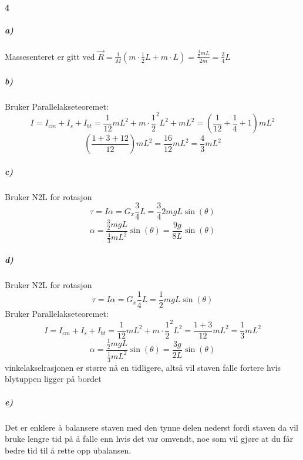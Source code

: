 \documentclass[11pt, A4paper,norsk]{article}
\begin{document}
		\paragraph{4}
			\subparagraph{a)}
				\begin{flushleft}
Massesenteret er gitt ved $\vec{R} = \frac{1}{M}(m \cdot \frac{1}{2}L + m \cdot L) = \frac{\frac{3}{2}mL}{2m} = \frac{3}{4}L$
				\end{flushleft}










			\subparagraph{b)}
				\begin{flushleft}
Bruker Parallelakseteoremet:
$$I = I_{cm} + I_s + I_{bt} = \frac{1}{12}mL^2 + m \cdot \frac{1}{2}^2L^2 + mL^2 = \left( \frac{1}{12} + \frac{1}{4} + 1 \right)mL^2$$
$$\left( \frac{1 + 3 + 12}{12} \right)mL^2 = \frac{16}{12} mL^2 = \frac{4}{3} mL^2$$
				\end{flushleft}










			\subparagraph{c)}
				\begin{flushleft}
Bruker N2L for rotasjon
$$\tau = I \alpha = G_x \frac{3}{4} L = \frac{3}{4} 2mgL \sin(\theta)$$
$$\alpha = \frac{\frac{3}{2} mgL}{\frac{4}{3}mL^2} \sin(\theta) = \frac{9g}{8L} \sin(\theta)$$
				\end{flushleft}








			\subparagraph{d)}
				\begin{flushleft}
Bruker N2L for rotasjon
$$\tau = I \alpha = G_x \frac{1}{4} L = \frac{1}{2} mgL \sin(\theta)$$
Bruker Parallelakseteoremet:
$$I = I_{cm} + I_s + I_{bt} = \frac{1}{12}mL^2 + m \cdot \frac{1}{2}^2L^2 = \frac{1 + 3}{12}mL^2 = \frac{1}{3}mL^2$$
$$\alpha = \frac{\frac{1}{2} mgL}{\frac{1}{3}mL^2} \sin(\theta) = \frac{3g}{2L} \sin(\theta)$$
vinkelakselrasjonen er større nå en tidligere, altså vil staven falle fortere hvis blytuppen ligger på bordet
				\end{flushleft}









			\subparagraph{e)}
				\begin{flushleft}
Det er enklere å balansere staven med den tynne delen nederst fordi staven da vil bruke lengre tid på å falle enn hvis det var omvendt, noe som vil gjøre at du får bedre tid til å rette opp ubalansen.
				\end{flushleft}
\end{document}
